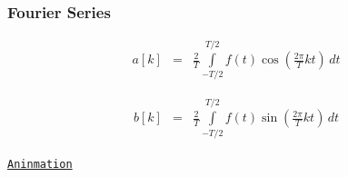 




\begin{frame}
    \frametitle{Fourier Series}

    \begin{eqnarray*}
        a[k] &=& \frac{2}{T} \int\limits_{-T/2}^{T/2} f(t) \cos \left(\frac{2\pi}{T}kt\right) \, dt
    \end{eqnarray*}

    \begin{eqnarray*}
        b[k] &=& \frac{2}{T} \int\limits_{-T/2}^{T/2} f(t) \sin \left(\frac{2\pi}{T}kt\right) \, dt
    \end{eqnarray*}


    \begin{flushright}
        \href{https://upload.wikimedia.org/wikipedia/commons/5/50/Fourier_transform_time_and_frequency_domains.gif}{\texttt{Aninmation}}
    \end{flushright}

\end{frame}



